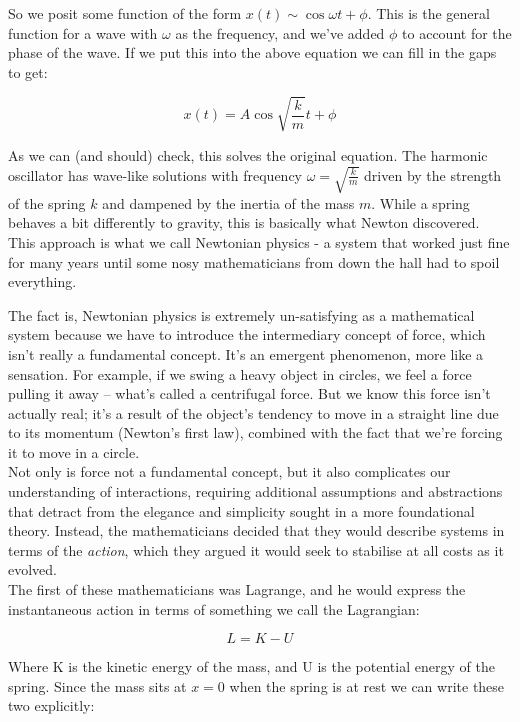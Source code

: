 \documentclass[krantz1,ChapterTOCs]{krantz}
\begin{document}
So we posit some function of the form $x(t)\sim\cos{\omega t+ \phi}$. This is the general function for a wave with $\omega$ as the frequency, and we've added $\phi$ to account for the phase of the wave. If we put this into the above equation we can fill in the gaps to get:

$$x(t)=A\cos{\sqrt{\frac{k}{m}} t + \phi}$$

As we can (and should) check, this solves the original equation. The harmonic oscillator has wave-like solutions with frequency $\omega = \sqrt{\frac{k}{m}}$ driven by the strength of the spring $k$ and dampened by the inertia of the mass $m$. While a spring behaves a bit differently to gravity, this is basically what Newton discovered.\\

This approach is what we call Newtonian physics - a system that worked just fine for many years until some nosy mathematicians from down the hall had to spoil everything.

The fact is, Newtonian physics is extremely un-satisfying as a mathematical system because we have to introduce the intermediary concept of force, which isn't really a fundamental concept. It's an emergent phenomenon, more like a sensation. For example, if we swing a heavy object in circles, we feel a force pulling it away – what's called a centrifugal force. But we know this force isn't actually real; it's a result of the object's tendency to move in a straight line due to its momentum (Newton's first law), combined with the fact that we're forcing it to move in a circle.\\

Not only is force not a fundamental concept, but it also complicates our understanding of interactions, requiring additional assumptions and abstractions that detract from the elegance and simplicity sought in a more foundational theory. Instead, the mathematicians decided that they would describe systems in terms of the {\it action}, which they argued it would seek to stabilise at all costs as it evolved.\\

The first of these mathematicians was Lagrange, and he would express the instantaneous action in terms of something we call the Lagrangian:

$$L = K - U$$

Where K is the kinetic energy of the mass, and U is the potential energy of the spring. Since the mass sits at $x=0$ when the spring is at rest we can write these two explicitly:
\end{document}
